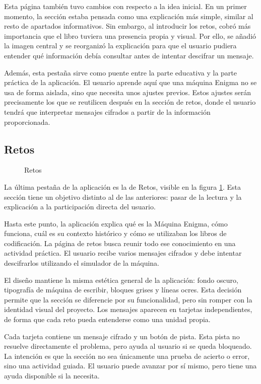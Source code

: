 Esta página también tuvo cambios con respecto a la idea inicial. En un primer momento, la sección estaba pensada como una explicación más simple, similar al resto de apartados informativos. Sin embargo, al introducir los retos, cobró más importancia que el libro tuviera una presencia propia y visual. Por ello, se añadió la imagen central y se reorganizó la explicación para que el usuario pudiera entender qué información debía consultar antes de intentar descifrar un mensaje.

Además, esta pestaña sirve como puente entre la parte educativa y la parte práctica de la aplicación. El usuario aprende aquí que una máquina Enigma no se usa de forma aislada, sino que necesita unos ajustes previos. Estos ajustes serán precisamente los que se reutilicen después en la sección de retos, donde el usuario tendrá que interpretar mensajes cifrados a partir de la información proporcionada.

\subsection{Retos}

\begin{figure}[htbp]
	\centerline{}
	\caption{Retos}
	\label{pruebas}
\end{figure}

La última pestaña de la aplicación es la de Retos, visible en la figura \ref{pruebas}. Esta sección tiene un objetivo distinto al de las anteriores: pasar de la lectura y la explicación a la participación directa del usuario.

Hasta este punto, la aplicación explica qué es la Máquina Enigma, cómo funciona, cuál es su contexto histórico y cómo se utilizaban los libros de codificación. La página de retos busca reunir todo ese conocimiento en una actividad práctica. El usuario recibe varios mensajes cifrados y debe intentar descifrarlos utilizando el simulador de la máquina.

El diseño mantiene la misma estética general de la aplicación: fondo oscuro, tipografía de máquina de escribir, bloques grises y líneas ocres. Esta decisión permite que la sección se diferencie por su funcionalidad, pero sin romper con la identidad visual del proyecto. Los mensajes aparecen en tarjetas independientes, de forma que cada reto pueda entenderse como una unidad propia.

Cada tarjeta contiene un mensaje cifrado y un botón de pista. Esta pista no resuelve directamente el problema, pero ayuda al usuario si se queda bloqueado. La intención es que la sección no sea únicamente una prueba de acierto o error, sino una actividad guiada. El usuario puede avanzar por sí mismo, pero tiene una ayuda disponible si la necesita.

